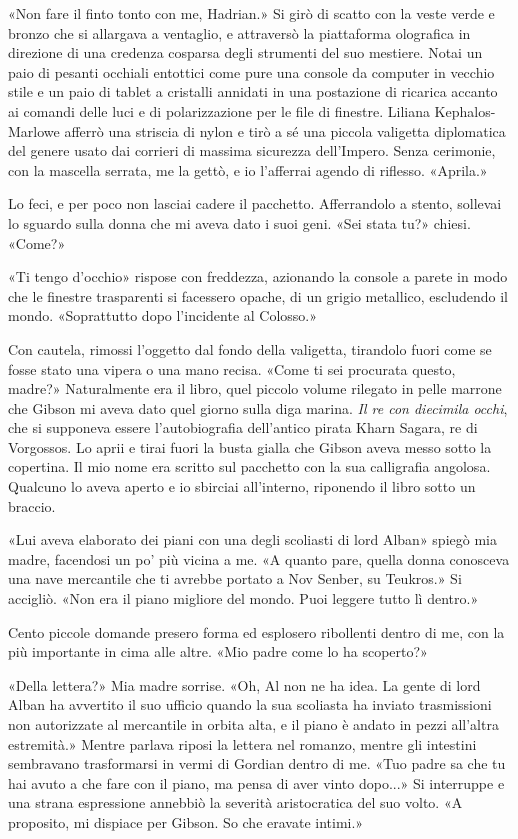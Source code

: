 «Non fare il finto tonto con me, Hadrian.» Si girò di scatto con la
veste verde e bronzo che si allargava a ventaglio, e attraversò la
piattaforma olografica in direzione di una credenza cosparsa degli
strumenti del suo mestiere. Notai un paio di pesanti occhiali entottici
come pure una console da computer in vecchio stile e un paio di tablet a
cristalli annidati in una postazione di ricarica accanto ai comandi
delle luci e di polarizzazione per le file di finestre. Liliana
Kephalos-Marlowe afferrò una striscia di nylon e tirò a sé una piccola
valigetta diplomatica del genere usato dai corrieri di massima sicurezza
dell'Impero. Senza cerimonie, con la mascella serrata, me la gettò, e io
l'afferrai agendo di riflesso. «Aprila.»

Lo feci, e per poco non lasciai cadere il pacchetto. Afferrandolo a
stento, sollevai lo sguardo sulla donna che mi aveva dato i suoi geni.
«Sei stata tu?» chiesi. «Come?»

«Ti tengo d'occhio» rispose con freddezza, azionando la console a parete
in modo che le finestre trasparenti si facessero opache, di un grigio
metallico, escludendo il mondo. «Soprattutto dopo l'incidente al
Colosso.»

Con cautela, rimossi l'oggetto dal fondo della valigetta, tirandolo
fuori come se fosse stato una vipera o una mano recisa. «Come ti sei
procurata questo, madre?» Naturalmente era il libro, quel piccolo volume
rilegato in pelle marrone che Gibson mi aveva dato quel giorno sulla
diga marina. \emph{Il re con diecimila occhi}, che si supponeva essere
l'autobiografia dell'antico pirata Kharn Sagara, re di Vorgossos. Lo
aprii e tirai fuori la busta gialla che Gibson aveva messo sotto la
copertina. Il mio nome era scritto sul pacchetto con la sua calligrafia
angolosa. Qualcuno lo aveva aperto e io sbirciai all'interno, riponendo
il libro sotto un braccio.

«Lui aveva elaborato dei piani con una degli scoliasti di lord Alban»
spiegò mia madre, facendosi un po' più vicina a me. «A quanto pare,
quella donna conosceva una nave mercantile che ti avrebbe portato a Nov
Senber, su Teukros.» Si accigliò. «Non era il piano migliore del mondo.
Puoi leggere tutto lì dentro.»

Cento piccole domande presero forma ed esplosero ribollenti dentro di
me, con la più importante in cima alle altre. «Mio padre come lo ha
scoperto?»

«Della lettera?» Mia madre sorrise. «Oh, Al non ne ha idea. La gente di
lord Alban ha avvertito il suo ufficio quando la sua scoliasta ha
inviato trasmissioni non autorizzate al mercantile in orbita alta, e il
piano è andato in pezzi all'altra estremità.» Mentre parlava riposi la
lettera nel romanzo, mentre gli intestini sembravano trasformarsi in
vermi di Gordian dentro di me. «Tuo padre sa che tu hai avuto a che fare
con il piano, ma pensa di aver vinto dopo...» Si interruppe e una strana
espressione annebbiò la severità aristocratica del suo volto. «A
proposito, mi dispiace per Gibson. So che eravate intimi.»

